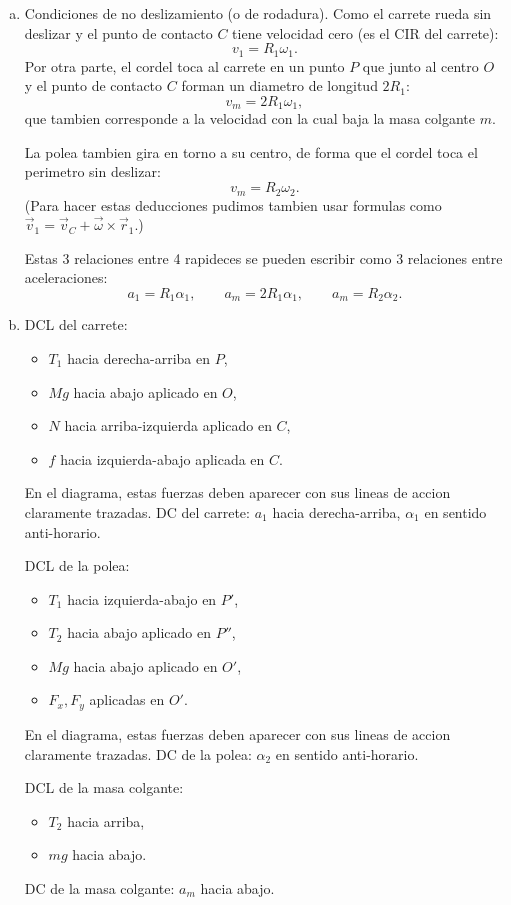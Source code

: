 \begin{enumerate}[a)]
\item

Condiciones de no deslizamiento (o de rodadura). Como el carrete rueda sin deslizar y el punto de contacto $C$ tiene velocidad cero (es el CIR del carrete):
\[
v_1=R_1\omega_1.
\]
Por otra parte, el cordel toca al carrete en un punto $P$ que junto al centro $O$ y el punto de contacto $C$ forman un diametro de longitud $2R_1$:
\[
v_m=2R_1\omega_1,
\]
que tambien corresponde a la velocidad con la cual baja la masa colgante $m$.

La polea tambien gira en torno a su centro, de forma que el cordel toca el perimetro sin deslizar:
\[
v_m=R_2\omega_2.
\]
(Para hacer estas deducciones pudimos tambien usar formulas como $\vec{v}_1=\vec{v}_C+\vec{\omega}\times\vec{r}_1$.)

Estas 3 relaciones entre 4 rapideces se pueden escribir como 3 relaciones entre aceleraciones:
\[
a_1=R_1\alpha_1,
\qquad
a_m=2R_1\alpha_1,
\qquad
a_m=R_2\alpha_2.
\]

\item

DCL del carrete:
\begin{itemize}
\item $T_1$ hacia derecha-arriba en $P$,
\item $Mg$ hacia abajo aplicado en $O$,
\item $N$ hacia arriba-izquierda aplicado en $C$,
\item $f$ hacia izquierda-abajo aplicada en $C$.
\end{itemize}
En el diagrama, estas fuerzas deben aparecer con sus lineas de accion claramente trazadas.
DC del carrete: $a_1$ hacia derecha-arriba, $\alpha_1$ en sentido anti-horario.

DCL de la polea:
\begin{itemize}
\item $T_1$ hacia izquierda-abajo en $P'$,
\item $T_2$ hacia abajo aplicado en $P''$,
\item $Mg$ hacia abajo aplicado en $O'$,
\item $F_x,F_y$ aplicadas en $O'$.
\end{itemize}
En el diagrama, estas fuerzas deben aparecer con sus lineas de accion claramente trazadas.
DC de la polea: $\alpha_2$ en sentido anti-horario.

DCL de la masa colgante:
\begin{itemize}
\item $T_2$ hacia arriba,
\item $mg$ hacia abajo.
\end{itemize}
DC de la masa colgante: $a_m$ hacia abajo.


\end{enumerate}
